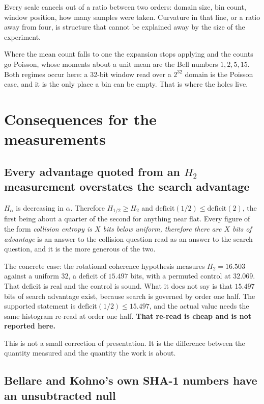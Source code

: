 Every scale cancels out of a ratio between two orders: domain size, bin count, window position, how many samples were taken. Curvature in that line, or a ratio away from four, is structure that cannot be explained away by the size of the experiment.

Where the mean count falls to one the expansion stops applying and the counts go Poisson, whose moments about a unit mean are the Bell numbers \(1, 2, 5, 15\). Both regimes occur here: a 32-bit window read over a \(2^{32}\) domain is the Poisson case, and it is the only place a bin can be empty. That is where the holes live.

\section{Consequences for the measurements}

\subsection{Every advantage quoted from an \texorpdfstring{\(H_2\)}{H2} measurement overstates the search advantage}

\(H_\alpha\) is decreasing in \(\alpha\). Therefore \(H_{1/2} \ge H_2\) and \(\mathrm{deficit}(1/2) \le \mathrm{deficit}(2)\), the first being about a quarter of the second for anything near flat. Every figure of the form \emph{collision entropy is \(X\) bits below uniform, therefore there are \(X\) bits of advantage} is an answer to the collision question read as an answer to the search question, and it is the more generous of the two.

The concrete case: the rotational coherence hypothesis measures \(H_2 = 16.503\) against a uniform \(32\), a deficit of \(15.497\) bits, with a permuted control at \(32.069\). That deficit is real and the control is sound. What it does not say is that \(15.497\) bits of search advantage exist, because search is governed by order one half. The supported statement is \(\mathrm{deficit}(1/2) \le 15.497\), and the actual value needs the same histogram re-read at order one half. \textbf{That re-read is cheap and is not reported here.}

This is not a small correction of presentation. It is the difference between the quantity measured and the quantity the work is about.

\subsection{Bellare and Kohno's own SHA-1 numbers have an unsubtracted null}

